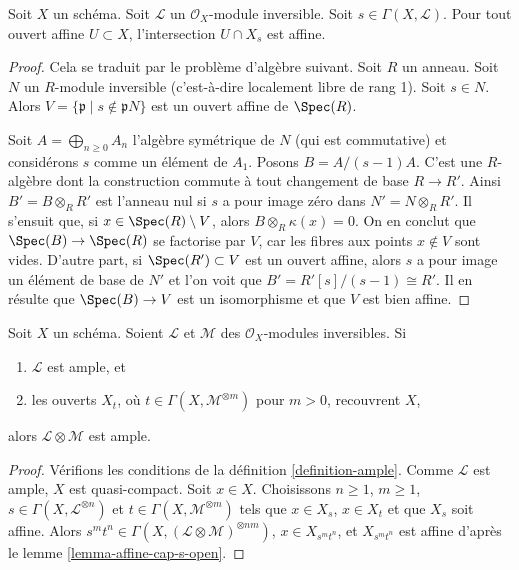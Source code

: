 \begin{lemma}
\label{lemma-affine-cap-s-open}
Soit $X$ un schéma. Soit $\mathcal{L}$ un $\mathcal{O}_X$-module
inversible. Soit $s \in \Gamma(X, \mathcal{L})$. Pour tout ouvert affine $U \subset X$,
l'intersection $U \cap X_s$ est affine.
\end{lemma}

\begin{proof}
Cela se traduit par le problème d'algèbre suivant.
Soit $R$ un anneau. Soit $N$ un $R$-module
inversible (c'est-à-dire localement libre de rang 1). Soit $s \in N$.
Alors $V = \{\mathfrak p \mid s \not \in \mathfrak p N\}$ est
un ouvert affine de $\Spec(R)$.

\medskip\noindent
Soit $A = \bigoplus_{n \geq 0} A_n$ l'algèbre symétrique de $N$
(qui est commutative) et considérons $s$ comme un élément de $A_1$.
Posons $B = A/(s - 1)A$. C'est une $R$-algèbre dont la construction
commute à tout changement de base $R \to R'$. Ainsi $B' = B \otimes_R R'$
est l'anneau nul si $s$ a pour image zéro dans $N' = N \otimes_R R'$. Il
s'ensuit que, si $x \in \Spec(R) \setminus V$, alors $B \otimes_R \kappa(x) = 0$.
On en conclut que $\Spec(B) \to \Spec(R)$ se factorise par $V$, car les
fibres aux points $x \not \in V$ sont vides. D'autre part, si
$\Spec(R') \subset V$ est un ouvert affine, alors $s$ a pour image un
élément de base de $N'$ et l'on voit que $B' = R'[s]/(s - 1) \cong R'$.
Il en résulte que $\Spec(B) \to V$ est un isomorphisme et que $V$ est
bien affine.
\end{proof}

\begin{lemma}
\label{lemma-ample-tensor-globally-generated}
\begin{reference}
\cite[II Proposition 4.5.6(ii)]{EGA}
\end{reference}
Soit $X$ un schéma. Soient $\mathcal{L}$ et $\mathcal{M}$
des $\mathcal{O}_X$-modules inversibles. Si
\begin{enumerate}
\item $\mathcal{L}$ est ample, et
\item les ouverts $X_t$, où $t \in \Gamma(X, \mathcal{M}^{\otimes m})$
pour $m > 0$, recouvrent $X$,
\end{enumerate}
alors $\mathcal{L} \otimes \mathcal{M}$ est ample.
\end{lemma}

\begin{proof}
Vérifions les conditions de la définition \ref{definition-ample}.
Comme $\mathcal{L}$ est ample, $X$ est quasi-compact.
Soit $x \in X$. Choisissons $n \geq 1$, $m \geq 1$,
$s \in \Gamma(X, \mathcal{L}^{\otimes n})$ et
$t \in \Gamma(X, \mathcal{M}^{\otimes m})$
tels que $x \in X_s$, $x \in X_t$ et que $X_s$ soit affine.
Alors $s^mt^n \in \Gamma(X, (\mathcal{L} \otimes \mathcal{M})^{\otimes nm})$,
$x \in X_{s^mt^n}$, et $X_{s^mt^n}$ est affine d'après
le lemme \ref{lemma-affine-cap-s-open}.
\end{proof}

